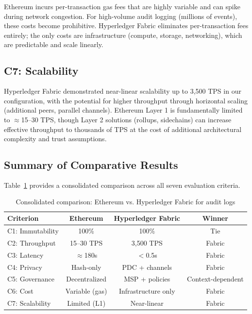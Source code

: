 \documentclass[12pt,a4paper]{article}
\begin{document}
Ethereum incurs per-transaction gas fees that are highly variable and can spike during network congestion. For high-volume audit logging (millions of events), these costs become prohibitive. Hyperledger Fabric eliminates per-transaction fees entirely; the only costs are infrastructure (compute, storage, networking), which are predictable and scale linearly.

\subsection{C7: Scalability}

Hyperledger Fabric demonstrated near-linear scalability up to 3,500 TPS in our configuration, with the potential for higher throughput through horizontal scaling (additional peers, parallel channels). Ethereum Layer 1 is fundamentally limited to $\approx$15--30 TPS, though Layer 2 solutions (rollups, sidechains) can increase effective throughput to thousands of TPS at the cost of additional architectural complexity and trust assumptions.

\subsection{Summary of Comparative Results}

Table~\ref{tab:summary} provides a consolidated comparison across all seven evaluation criteria.

\begin{table}[H]
\centering
\caption{Consolidated comparison: Ethereum vs. Hyperledger Fabric for audit logs}
\label{tab:summary}
\small
\begin{tabular}{@{}lccc@{}}
\toprule
\textbf{Criterion} & \textbf{Ethereum} & \textbf{Hyperledger Fabric} & \textbf{Winner} \\
\midrule
C1: Immutability         & 100\%          & 100\%                & Tie \\
C2: Throughput           & 15--30 TPS     & 3,500 TPS            & Fabric \\
C3: Latency              & $\approx$180s  & $<$0.5s              & Fabric \\
C4: Privacy              & Hash-only      & PDC + channels       & Fabric \\
C5: Governance           & Decentralized  & MSP + policies       & Context-dependent \\
C6: Cost                 & Variable (gas) & Infrastructure only  & Fabric \\
C7: Scalability          & Limited (L1)   & Near-linear          & Fabric \\
\bottomrule
\end{tabular}
\end{table}
\end{document}
